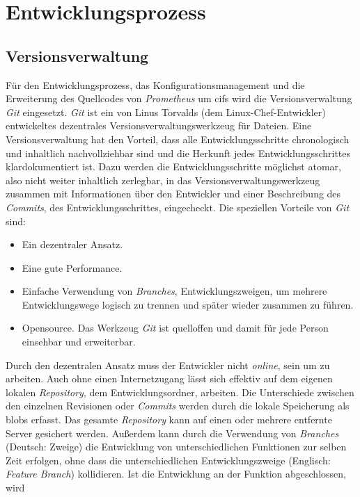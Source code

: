 \documentclass[titlepage]{report}
\begin{document}
\section{Entwicklungsprozess}
\subsection{Versionsverwaltung}
Für den Entwicklungsprozess, das Konfigurationsmanagement und die
Erweiterung des Quellcodes von \emph{Prometheus} um \gls{cifs} wird die
Versionsverwaltung \emph{Git} eingesetzt. \emph{Git} ist ein von Linus
Torvalds (dem Linux\hyp{}Chef\hyp{}Entwickler) entwickeltes dezentrales
Versionsverwaltungswerkzeug für Dateien\cite{GITWIKI}. Eine
Versionsverwaltung hat den Vorteil, dass alle Entwicklungsschritte
chronologisch und inhaltlich nachvollziehbar sind und die Herkunft jedes
Entwicklungsschrittes klardokumentiert ist. Dazu werden die
Entwicklungsschritte möglichst atomar, also nicht weiter inhaltlich
zerlegbar, in das Versionsverwaltungswerkzeug zusammen mit Informationen
über den Entwickler und einer Beschreibung des \emph{Commits}, des
Entwicklungsschrittes, eingecheckt\cite{GITBOOK}. Die speziellen
Vorteile von \emph{Git} sind:
\begin{itemize}
    \item Ein dezentraler Ansatz.
    \item Eine gute Performance.
    \item Einfache Verwendung von \emph{Branches}, Entwicklungszweigen,
        um mehrere Entwicklungswege logisch zu trennen und später wieder
        zusammen zu führen.
    \item Opensource. Das Werkzeug \emph{Git} ist quelloffen und damit
        für jede Person einsehbar und erweiterbar.
\end{itemize}
Durch den dezentralen Ansatz muss der Entwickler nicht
\emph{online}, sein um zu arbeiten. Auch ohne einen Internetzugang lässt
sich effektiv auf dem eigenen lokalen \emph{Repository}, dem
Entwicklungsordner, arbeiten. Die Unterschiede zwischen den einzelnen
Revisionen oder \emph{Commits} werden durch die lokale Speicherung als
\glspl{blob} erfasst. Das gesamte \emph{Repository} kann auf einen oder
mehrere entfernte Server gesichert werden\cite{GITOTTO}. Außerdem kann
durch die Verwendung von \emph{Branches} (Deutsch: Zweige) die
Entwicklung von unterschiedlichen Funktionen zur selben Zeit erfolgen,
ohne dass die unterschiedlichen Entwicklungszweige (Englisch:
\emph{Feature Branch}) kollidieren. Ist die Entwicklung an der Funktion
abgeschlossen, wird
\end{document}
